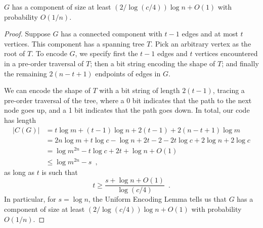 \documentclass{patmorin}
\begin{document}
\begin{lem}
  $G$ has a component of size at least $(2/\log(c/4))\log n + O(1)$
  with probability $O(1/n)$.
\end{lem}
\begin{proof}
  Suppose $G$ has a connected component with $t - 1$ edges and at most
  $t$ vertices. This component has a spanning tree $T$. Pick an
  arbitrary vertex as the root of $T$. To encode $G$, we specify
  first the $t - 1$ edges and $t$ vertices encountered in a pre-order
  traversal of $T$; then a bit string encoding the shape of $T$; and
  finally the remaining $2(n - t + 1)$ endpoints of edges in $G$.

  We can encode the shape of $T$ with a bit string of length
  $2(t - 1)$, tracing a pre-order traversal of the tree, where a 0 bit
  indicates that the path to the next node goes up, and a 1 bit indicates
  that the path goes down. In total, our code has length
  \begin{align*}
    |C(G)| &= t \log m + (t - 1) \log n + 2(t - 1) + 2 (n - t + 1) \log m \\
           &= 2n\log m + t \log c - \log n + 2t - 2 - 2t \log c + 2\log n + 2 \log c \tag{since $m = cn$}\\
           &= \log m^{2n} - t \log c + 2t + \log n + O(1) \\
           &\le \log m^{2n} - s \enspace ,
  \end{align*}
  as long as $t$ is such that
  \[
    t \geq \frac{s + \log n + O(1)}{\log (c/4)} \enspace .
  \]
  In particular, for $s = \log n$, the Uniform
  Encoding Lemma tells us that $G$ has a component of size at least
  $(2/\log (c/4))\log n + O(1)$ with probability $O(1/n)$.
\end{proof}
\end{document}
